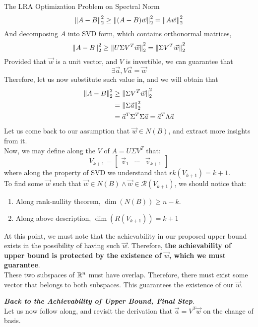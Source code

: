 \begin{ln-explain}{The LRA Optimization Problem on Spectral Norm}{}
    \[
        \pnorm[2]{A - B}{2} \geq \pnorm[2]{(A - B) \vec{w}}{2} = \pnorm[2]{A \vec{w}}{2}
    \]
    And decomposing $A$ into SVD form, which contains orthonormal matrices,
    \[
        \pnorm[2]{A - B}{2} \geq \pnorm[2]{U \Sigma V^T \vec{w}}{2} = \pnorm[2]{\Sigma V^T \vec{w}}{2}
    \]
    Provided that $\vec{w}$ is a unit vector, and $V$ is invertible, we can guarantee that
    \[
        \exists \vec{a}, V \vec{a} = \vec{w}
    \]
    Therefore, let us now substitute such value in, and we will obtain that
    \begin{align*}
        \pnorm[2]{A - B}{2}
        &\geq \pnorm[2]{\Sigma V^T \vec{w}}{2} \\
        &= \pnorm[2]{\Sigma \vec{a}}{2} \\
        &= \vec{a}^T \Sigma^T \Sigma \vec{a} = \vec{a}^T \Lambda \vec{a}
    \end{align*}
    Let us come back to our assumption that $\vec{w} \in N(B)$, and extract more insights from it. \\
    Now, we may define along the $V$ of $A = U \Sigma V^T$ that:
    \[
        V_{k + 1} = \begin{bmatrix} \vec{v}_1 & \cdots & \vec{v}_{k + 1}\end{bmatrix}
    \]
    where along the property of SVD we understand that $rk(V_{k + 1}) = k + 1$. \\
    To find some $\vec{w}$ such that $\vec{w} \in N(B) \land \vec{w} \in \mathcal{R}(V_{k + 1})$, we should notice that:
    \begin{enumerate}
        \item Along rank-nullity theorem, $\dim(N(B)) \geq n - k$.
        \item Along above description, $\dim(R(V_{k + 1})) = k + 1$
    \end{enumerate}
    At this point, we must note that the achievability in our proposed upper bound exists in the possibility of having such $\vec{w}$. Therefore, \textbf{the achievability of upper bound is protected by the existence of $\vec{w}$, which we must guarantee}. \\
    These two subspaces of $\R^n$ must have overlap. Therefore, there must exist some vector that belongs to both subspaces. This guarantees the existence of our $\vec{w}$.
    \par
    \textbf{\textit{Back to the Achievability of Upper Bound, Final Step}}. \\
    Let us now follow along, and revisit the derivation that $\vec{a} = V^T \vec{w}$ on the change of basis. \\

\end{ln-explain}
